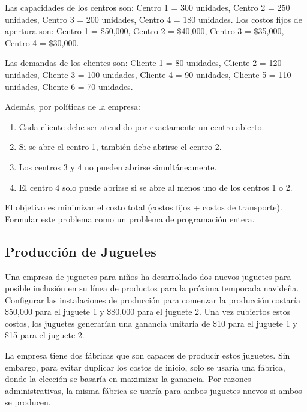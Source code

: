 \documentclass[12pt]{article}
\begin{document}
Las capacidades de los centros son: Centro 1 = 300 unidades, Centro 2 = 250 unidades, Centro 3 = 200 unidades, Centro 4 = 180 unidades. Los costos fijos de apertura son: Centro 1 = \$50,000, Centro 2 = \$40,000, Centro 3 = \$35,000, Centro 4 = \$30,000.

\vspace{0.5em}

Las demandas de los clientes son: Cliente 1 = 80 unidades, Cliente 2 = 120 unidades, Cliente 3 = 100 unidades, Cliente 4 = 90 unidades, Cliente 5 = 110 unidades, Cliente 6 = 70 unidades.

\vspace{0.5em}

Además, por políticas de la empresa:
\begin{enumerate}[label=\arabic*.]
    \item Cada cliente debe ser atendido por exactamente un centro abierto.
    \item Si se abre el centro 1, también debe abrirse el centro 2.
    \item Los centros 3 y 4 no pueden abrirse simultáneamente.
    \item El centro 4 solo puede abrirse si se abre al menos uno de los centros 1 o 2.
\end{enumerate}

El objetivo es minimizar el costo total (costos fijos + costos de transporte). Formular este problema como un problema de programación entera.

\subsection{Producción de Juguetes}
Una empresa de juguetes para niños ha desarrollado dos nuevos juguetes para posible inclusión en su línea de productos para la próxima temporada navideña. Configurar las instalaciones de producción para comenzar la producción costaría \$50,000 para el juguete 1 y \$80,000 para el juguete 2. Una vez cubiertos estos costos, los juguetes generarían una ganancia unitaria de \$10 para el juguete 1 y \$15 para el juguete 2.

\vspace{0.5em}

La empresa tiene dos fábricas que son capaces de producir estos juguetes. Sin embargo, para evitar duplicar los costos de inicio, solo se usaría una fábrica, donde la elección se basaría en maximizar la ganancia. Por razones administrativas, la misma fábrica se usaría para ambos juguetes nuevos si ambos se producen.
\end{document}
